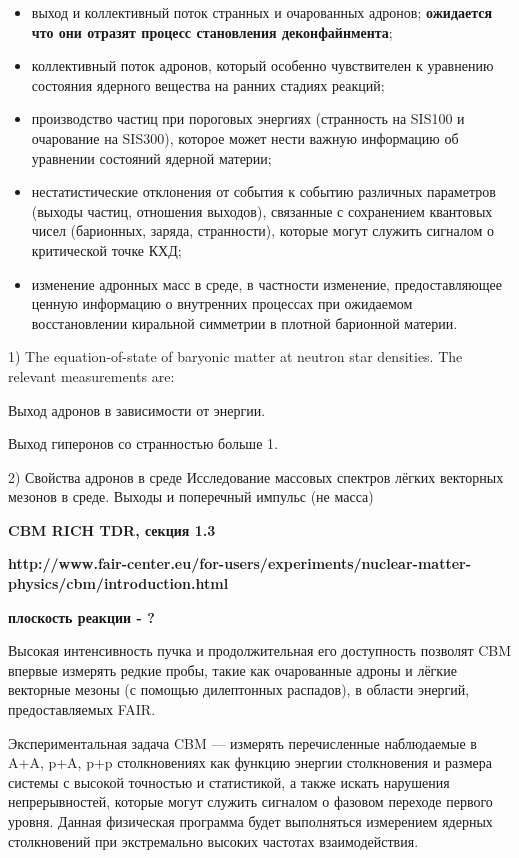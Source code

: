 \begin{itemize}
\item выход и коллективный поток странных и очарованных адронов; \textbf{ожидается что они отразят процесс становления деконфайнмента};
\item коллективный поток адронов, который особенно чувствителен к уравнению состояния ядерного вещества на ранних стадиях реакций;
\item производство частиц при пороговых энергиях (странность на SIS100 и очарование на SIS300), которое может нести важную информацию об уравнении состояний ядерной материи;
\item нестатистические отклонения от события к событию различных параметров (выходы частиц, отношения выходов), связанные с сохранением квантовых чисел (барионных, заряда, странности), которые могут служить сигналом о критической точке КХД;
\item изменение адронных масс в среде, в частности изменение, предоставляющее ценную информацию о внутренних процессах при ожидаемом восстановлении киральной симметрии в плотной барионной материи.
\end{itemize}

1) The equation-of-state of baryonic matter at neutron star densities.
The relevant measurements are:

Выход адронов в зависимости от энергии.

Выход гиперонов со странностью больше 1.


2) Свойства адронов в среде
Исследование массовых спектров лёгких векторных мезонов в среде.
Выходы и поперечный импульс (не масса) 


\todo \textbf{CBM RICH TDR, секция 1.3}

\todo \textbf{http://www.fair-center.eu/for-users/experiments/nuclear-matter-physics/cbm/introduction.html}

\todo \textbf{плоскость реакции - ?}

Высокая интенсивность пучка и продолжительная его доступность позволят CBM впервые измерять редкие пробы, такие как очарованные адроны и лёгкие векторные мезоны (с помощью дилептонных распадов), в области энергий, предоставляемых FAIR.

Экспериментальная задача CBM --- измерять перечисленные наблюдаемые в A+A, p+A, p+p столкновениях как функцию энергии столкновения и размера системы с высокой точностью и статистикой, а также искать нарушения непрерывностей, которые могут служить сигналом о фазовом переходе первого уровня. Данная физическая программа будет выполняться измерением ядерных столкновений при экстремально высоких частотах взаимодействия.









